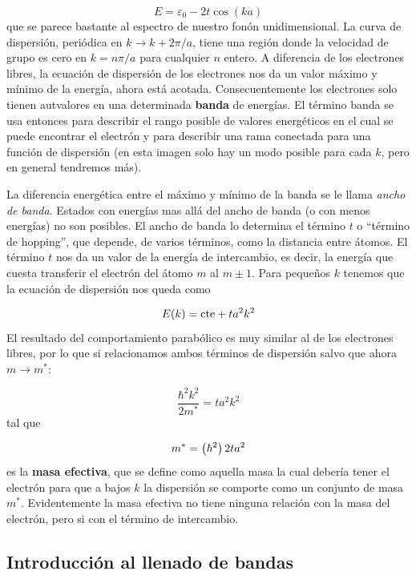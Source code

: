 \begin{equation}
	E=\varepsilon_0 - 2 t \cos (ka)
\end{equation}
que se parece bastante al espectro de nuestro fonón unidimensional. La curva de dispersión, periódica en $k\rightarrow k+2\pi/a$, tiene una región donde la velocidad de grupo es cero en $k=n\pi/a$ para cualquier $n$ entero. A diferencia de los electrones libres, la ecuación de dispersión de los electrones nos da un valor máximo y mínimo de la energía, ahora está acotada. Consecuentemente los electrones solo tienen autvalores en una determinada \textbf{banda} de energías. El término banda se usa entonces para describir el rango posible de valores energéticos en el cual se puede encontrar el electrón y para describir una rama conectada para una función de dispersión (en esta imagen solo hay un modo posible para cada $k$, pero en general tendremos más).

La diferencia energética entre el máximo y mínimo de la banda se le llama \textit{ancho de banda}. Estados con energías mas allá del ancho de banda (o con menos energías) no son posibles. El ancho de banda lo determina el término $t$ o ``término de hopping'', que depende, de varios términos, como la distancia entre átomos. El término $t$ nos da un valor de la energía de intercambio, es decir, la energía que cuesta transferir el electrón del átomo $m$ al $m\pm 1$. Para pequeños $k$ tenemos que la ecuación de dispersión nos queda como

\begin{equation}
	E(k) = \text{cte} + ta^2 k^2
\end{equation}
El resultado del comportamiento parabólico es muy similar al de los electrones libres, por lo que si relacionamos ambos términos de dispersión salvo que ahora $m\rightarrow m^* $:

\begin{equation}
	\frac{\hbar^2 k^2}{2m^* } = t a^2 k^2
\end{equation}
tal que

\begin{equation}
	m^* = \left( \hbar^2 \right){2ta^2}
\end{equation}
es la \textbf{masa efectiva}, que se define como aquella masa la cual debería tener el electrón para que a bajos $k$ la dispersión se comporte como un conjunto de masa $m^*$. Evidentemente la masa efectiva no tiene ninguna relación con la masa del electrón, pero si con el término de intercambio. 

\subsection{Introducción al llenado de bandas}

